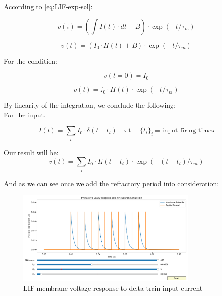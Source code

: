 According to \ref{eq:LIF-exp-sol}:

\begin{equation}
	v(t) = (\int I(t) \cdot dt + B) \cdot \exp(-t/\tau_m)
\end{equation}

\begin{equation}
	v(t) = (I_0 \cdot H(t) + B) \cdot \exp(-t/\tau_m)
\end{equation}

For the condition: 

\begin{equation}
	v(t=0) = I_0
\end{equation}

\begin{equation}
	v(t) = I_0 \cdot H(t) \cdot \exp(-t/\tau_m)
\end{equation}

By linearity of the integration, we conclude the following: \\
For the input:

\begin{equation}
	I(t) = \sum_i I_0 \cdot \delta(t-t_i) \quad \text{s.t.} \quad \{t_i\}_i = \text{input firing times}
\end{equation}

Our result will be:
\begin{equation}
	v(t) = \sum_i I_0 \cdot H(t-t_i) \cdot \exp(-(t-t_i)/\tau_m) \label{eq:LIF-spike-sol}
\end{equation}

And as we can see once we add the refractory period into consideration:

\begin{figure}[H]
    \centering
    \includegraphics[width=0.8\textwidth]{methods/computational-models/graphs/LIF-spike-response-ref.png}
    \caption{LIF membrane voltage response to delta train input current}
    \label{fig:LIF-spike-ref}
\end{figure}

